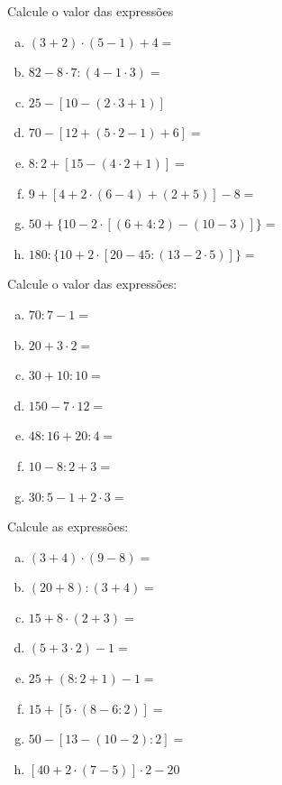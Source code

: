 \item Calcule o valor das expressões
\begin{multicols}{2}
\begin{enumerate}[a)]
	\item $(3+2)\cdot (5-1)+4 =$
	\item $ 82-8\cdot 7:(4-1\cdot 3) =$
	\item $25-[10-(2\cdot 3+1)] $
	\item $70-[12+(5\cdot 2-1)+6] =$
	\item $8:2+[15-(4\cdot 2+1)] =$
	\item $9+[4+2\cdot (6-4)+(2+5)]-8 =$
	\item $50+\{10-2\cdot [(6+4:2)-(10-3)]\} =$
	\item $180:\{10+2\cdot [20-45:(13-2\cdot 5)]\} =$	
\end{enumerate}
\end{multicols}

\item Calcule o valor das expressões:
\begin{multicols}{2}
\begin{enumerate}[a)]
	\item $70:7-1=$
	\item $ 20+3\cdot 2=$
	\item $30+10:10 =$
	\item $ 150-7\cdot 12=$
	\item $48:16+20:4 =$
	\item $10-8:2+3 =$
	\item $ 30:5-1+2\cdot 3 =$
\end{enumerate}
\end{multicols}

\item Calcule as expressões:
\begin{multicols}{2}
\begin{enumerate}[a)]
	\item $(3+4)\cdot (9-8) =$
	\item $(20+8):(3+4) =$
	\item $15+8\cdot (2+3) =$
	\item $(5+3\cdot 2)-1=$
	\item $ 25+(8:2+1)-1= $
	\item $15+[5\cdot (8-6:2)] =$
	\item $50-[13-(10-2):2] =$
	\item $[40+2\cdot (7-5)]\cdot 2-20 $
\end{enumerate}
\end{multicols}

